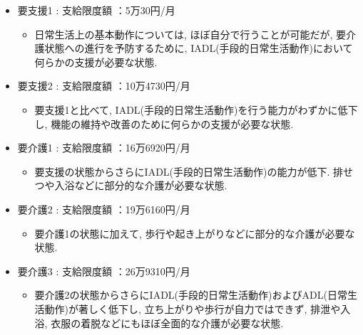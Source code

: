 \begin{itemize} \setlength{\itemsep}{-0.5mm} \setlength{\parskip}{-0.5mm}
	\item 要支援1  :  支給限度額 ：5万30円/月
	      \begin{itemize} \setlength{\itemsep}{-0.5mm} \setlength{\parskip}{-0.5mm}
		      \item 日常生活上の基本動作については, ほぼ自分で行うことが可能だが, 要介護状態への進行を予防するために, IADL(手段的日常生活動作)において何らかの支援が必要な状態.
	      \end{itemize}

	\item 要支援2  :  支給限度額 ：10万4730円/月

	      \begin{itemize} \setlength{\itemsep}{-0.5mm} \setlength{\parskip}{-0.5mm}
		      \item 要支援1と比べて, IADL(手段的日常生活動作)を行う能力がわずかに低下し, 機能の維持や改善のために何らかの支援が必要な状態.

	      \end{itemize}

	\item 要介護1 : 支給限度額 ：16万6920円/月


	      \begin{itemize} \setlength{\itemsep}{-0.5mm} \setlength{\parskip}{-0.5mm}
		      \item 要支援の状態からさらにIADL(手段的日常生活動作)の能力が低下. 排せつや入浴などに部分的な介護が必要な状態.

	      \end{itemize}

	\item 要介護2 : 支給限度額 ：19万6160円/月


	      \begin{itemize} \setlength{\itemsep}{-0.5mm} \setlength{\parskip}{-0.5mm}
		      \item 要介護1の状態に加えて, 歩行や起き上がりなどに部分的な介護が必要な状態.

	      \end{itemize}

	\item 要介護3 : 支給限度額 ：26万9310円/月


	      \begin{itemize} \setlength{\itemsep}{-0.5mm} \setlength{\parskip}{-0.5mm}
		      \item 要介護2の状態からさらにIADL(手段的日常生活動作)およびADL(日常生活動作)が著しく低下し, 立ち上がりや歩行が自力ではできず, 排泄や入浴, 衣服の着脱などにもほぼ全面的な介護が必要な状態.


\end{itemize}
\end{itemize}
